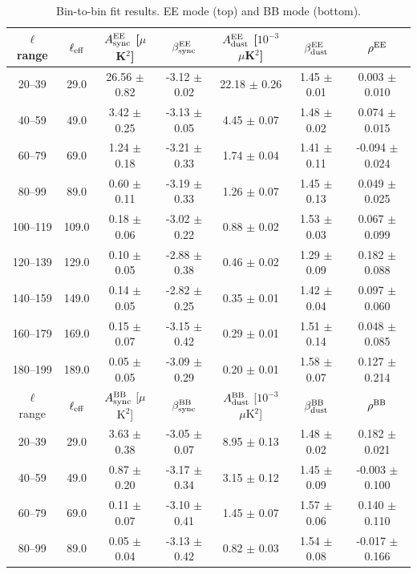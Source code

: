 \begin{table}[htbp]
\centering
\caption{Bin-to-bin fit results. EE mode (top) and BB mode (bottom).}
\label{tab:bin_to_bin_results_galcut_20}
\begin{tabular}{c c c c c c c}
\hline\hline
$\ell$ range & $\ell_{\rm eff}$ & $A^{\rm EE}_{\rm sync}$ [$\mu$K$^2$] & $\beta^{\rm EE}_{\rm sync}$ & $A^{\rm EE}_{\rm dust}$ [$10^{-3}$ $\mu$K$^2$] & $\beta^{\rm EE}_{\rm dust}$ & $\rho^{\rm EE}$ \\
\hline
20--39 & 29.0 & 26.56 $\pm$ 0.82 & -3.12 $\pm$ 0.02 & 22.18 $\pm$ 0.26 & 1.45 $\pm$ 0.01 & 0.003 $\pm$ 0.010 \\
40--59 & 49.0 & 3.42 $\pm$ 0.25 & -3.13 $\pm$ 0.05 & 4.45 $\pm$ 0.07 & 1.48 $\pm$ 0.02 & 0.074 $\pm$ 0.015 \\
60--79 & 69.0 & 1.24 $\pm$ 0.18 & -3.21 $\pm$ 0.33 & 1.74 $\pm$ 0.04 & 1.41 $\pm$ 0.11 & -0.094 $\pm$ 0.024 \\
80--99 & 89.0 & 0.60 $\pm$ 0.11 & -3.19 $\pm$ 0.33 & 1.26 $\pm$ 0.07 & 1.45 $\pm$ 0.13 & 0.049 $\pm$ 0.025 \\
100--119 & 109.0 & 0.18 $\pm$ 0.06 & -3.02 $\pm$ 0.22 & 0.88 $\pm$ 0.02 & 1.53 $\pm$ 0.03 & 0.067 $\pm$ 0.099 \\
120--139 & 129.0 & 0.10 $\pm$ 0.05 & -2.88 $\pm$ 0.38 & 0.46 $\pm$ 0.02 & 1.29 $\pm$ 0.09 & 0.182 $\pm$ 0.088 \\
140--159 & 149.0 & 0.14 $\pm$ 0.05 & -2.82 $\pm$ 0.25 & 0.35 $\pm$ 0.01 & 1.42 $\pm$ 0.04 & 0.097 $\pm$ 0.060 \\
160--179 & 169.0 & 0.15 $\pm$ 0.07 & -3.15 $\pm$ 0.42 & 0.29 $\pm$ 0.01 & 1.51 $\pm$ 0.14 & 0.048 $\pm$ 0.085 \\
180--199 & 189.0 & 0.05 $\pm$ 0.05 & -3.09 $\pm$ 0.29 & 0.20 $\pm$ 0.01 & 1.58 $\pm$ 0.07 & 0.127 $\pm$ 0.214 \\
\hline
$\ell$ range & $\ell_{\rm eff}$ & $A^{\rm BB}_{\rm sync}$ [$\mu$K$^2$] & $\beta^{\rm BB}_{\rm sync}$ & $A^{\rm BB}_{\rm dust}$ [$10^{-3}$ $\mu$K$^2$] & $\beta^{\rm BB}_{\rm dust}$ & $\rho^{\rm BB}$ \\
\hline
20--39 & 29.0 & 3.63 $\pm$ 0.38 & -3.05 $\pm$ 0.07 & 8.95 $\pm$ 0.13 & 1.48 $\pm$ 0.02 & 0.182 $\pm$ 0.021 \\
40--59 & 49.0 & 0.87 $\pm$ 0.20 & -3.17 $\pm$ 0.34 & 3.15 $\pm$ 0.12 & 1.45 $\pm$ 0.09 & -0.003 $\pm$ 0.100 \\
60--79 & 69.0 & 0.11 $\pm$ 0.07 & -3.10 $\pm$ 0.41 & 1.45 $\pm$ 0.07 & 1.57 $\pm$ 0.06 & 0.140 $\pm$ 0.110 \\
80--99 & 89.0 & 0.05 $\pm$ 0.04 & -3.13 $\pm$ 0.42 & 0.82 $\pm$ 0.03 & 1.54 $\pm$ 0.08 & -0.017 $\pm$ 0.166 \\

\end{tabular}
\end{table}
